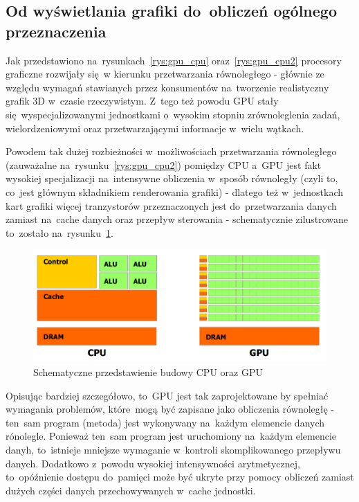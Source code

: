 \subsection{Od wyświetlania grafiki do~obliczeń ogólnego przeznaczenia}
Jak przedstawiono na~rysunkach~\ref{rys:gpu_cpu} oraz~\ref{rys:gpu_cpu2} procesory graficzne rozwijały się~w kierunku przetwarzania równoległego - głównie ze względu wymagań stawianych przez konsumentów na~tworzenie realistyczny grafik 3D w~czasie rzeczywistym. Z~tego też powodu GPU stały się~wyspecjalizowanymi jednostkami o~wysokim stopniu zrównoleglenia zadań, wielordzeniowymi oraz przetwarzającymi informacje w~wielu wątkach. 

Powodem tak dużej rozbieżności w~możliwościach przetwarzania równoległego (zauważalne na~rysunku~\ref{rys:gpu_cpu2}) pomiędzy CPU a~GPU jest fakt wysokiej specjalizacji na~intensywne obliczenia w~sposób równoległy (czyli to, co~jest głównym składnikiem renderowania grafiki) - dlatego też w~jednostkach kart grafiki więcej tranzystorów przeznaczonych jest do~przetwarzania danych zamiast na~cache danych oraz przepływ sterowania - schematycznie zilustrowane to~zostało na~rysunku~\ref{rys:gpu_cpu_trans}.

\begin{figure}[ht]
\centering\includegraphics[width=1.0\textwidth]{figures/03/gpu_cpu_trans.png}
\caption{Schematyczne przedstawienie budowy CPU oraz GPU~\cite{Cuda:PGuide}}\label{rys:gpu_cpu_trans}
\end{figure}

Opisując bardziej szczegółowo, to~GPU jest tak zaprojektowane by spełniać wymagania problemów, które~mogą być zapisane jako obliczenia równoległę - ten~sam program (metoda) jest wykonywany na~każdym elemencie danych rónolegle. Ponieważ ten~sam program jest uruchomiony na~każdym elemencie danyh, to~istnieje mniejsze wymaganie w~kontroli skomplikowanego przepływu danych. Dodatkowo z~powodu wysokiej intensywności arytmetycznej, to~opóźnienie dostępu do~pamięci może być ukryte przy pomocy obliczeń zamiast dużych części danych przechowywanych w~cache jednostki.

